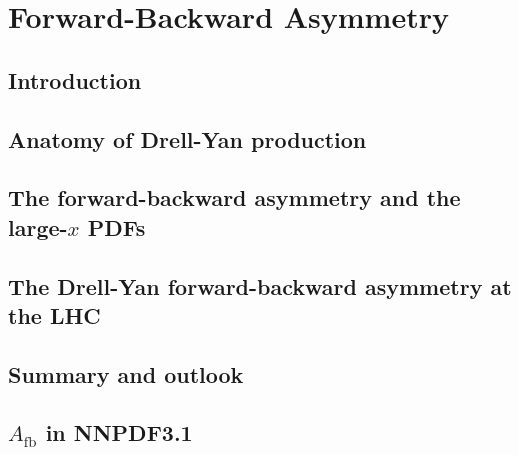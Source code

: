 
\chapter{Forward-Backward Asymmetry}
\label{ch:afb}
\minitoc
\adjustmtc


\section{Introduction}
\label{sec:intro}
% 

\section{Anatomy of Drell-Yan production}
\label{sec:HMDY}
% 

\section{The forward-backward asymmetry and the large-\texorpdfstring{$x$}{x} PDFs}
\label{sec:largexpdfs}
% 

\section{The Drell-Yan forward-backward asymmetry at the LHC}
\label{sec:afb}
% 

\section{Summary and outlook}
\label{sec:summary}
% 

\section{\texorpdfstring{$A_\text{fb}$}{Afb} in NNPDF3.1}
\label{app:nnpdf31}
% 
